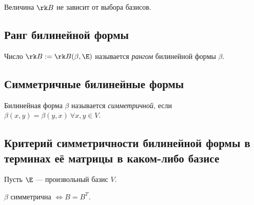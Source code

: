 \begin{corollary}
    Величина $\rk B$ не зависит от выбора базисов. 
\end{corollary}


\subsection{Ранг билинейной формы}

\begin{definition}
    Число $\rk B := \rk B(\beta, \E)$ называется \textit{рангом} билинейной формы $\beta$.
\end{definition}


\subsection{Симметричные билинейные формы}

\begin{definition}
    Билинейная форма $\beta$ называется \textit{симметричной}, если $\beta(x, y) = \beta(y, x) \ \forall x, y \in V$.
\end{definition}


\subsection{Критерий симметричности билинейной формы в терминах её матрицы в каком-либо базисе}

Пусть $\E$ --- произвольный базис $V$.

\begin{proposal}
    $\beta$ симметрична $\iff B = B^{T}$.
\end{proposal}

